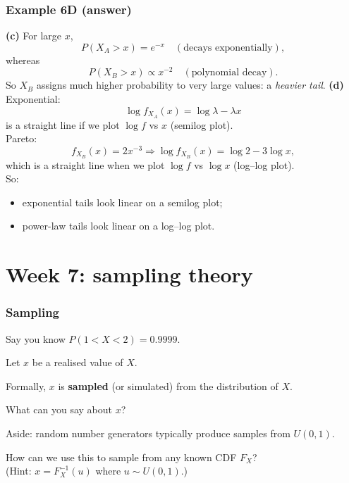 \documentclass[t,8pt]{beamer}
\begin{document}
\begin{frame}
	\frametitle{Example 6D (answer)}
	\textbf{(c)} For large $x$,
	\[
	P(X_A > x) = e^{-x} \quad(\text{decays exponentially}),
	\]
	whereas
	\[
	P(X_B > x) \propto x^{-2} \quad(\text{polynomial decay}).
	\]
	So $X_B$ assigns much higher probability to very large values:
	a \emph{heavier tail}.
	\textbf{(d)} Exponential:
	\[
	\log f_{X_A}(x) = \log \lambda - \lambda x
	\]
	is a straight line if we plot $\log f$ vs $x$ (semilog plot). \\
	Pareto:
	\[
	f_{X_B}(x) = 2x^{-3}
	\Rightarrow \log f_{X_B}(x) = \log 2 - 3\log x,
	\]
	which is a straight line when we plot $\log f$ vs $\log x$
	(log–log plot). \\
	So:
	\begin{itemize}
		\item exponential tails look linear on a semilog plot;
		\item power-law tails look linear on a log–log plot.
	\end{itemize}
\end{frame}



\section{Week 7: sampling theory}

\begin{frame}
	\frametitle{Sampling}
	Say you know $P(1<X<2)=0.9999$. \par
	Let $x$ be a realised value of $X$. \par
	Formally, $x$ is {\bf sampled} (or simulated) from the distribution of $X$. \par
	What can you say about $x$? \par
	\vspace{10pt}
	Aside: random number generators typically produce samples from $U(0,1)$. \par
	{\small\color{NavyBlue}
		How can we use this to sample from any known CDF $F_X$? \\
		(Hint: $x = F_X^{-1}(u)$ where $u\sim U(0,1)$.)
	}
\end{frame}
\end{document}
